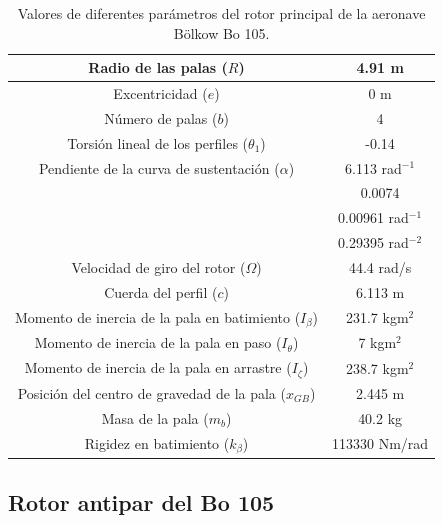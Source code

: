 \begin{table}[]
	\centering
	\begin{tabular}{|>{\columncolor{Gray}}c|c|}
		\hline
		Radio de las palas ($R$) & 4.91 m \\ \hline
		Excentricidad ($e$) & 0 m \\ \hline
		Número de palas ($b$) & 4 \\ \hline
		Torsión lineal de los perfiles ($\theta_1$) & -0.14 \\ \hline
		Pendiente de la curva de sustentación ($\alpha$) & 6.113 rad$^{-1}$ \\ \hline
		\cellcolor{Gray} & 0.0074 \\ \cline{2-2} 
		\cellcolor{Gray} & 0.00961 rad$^{-1}$ \\ \cline{2-2} 
		\multirow{-3}{*}{\cellcolor{Gray}Parámetros de la polar ($\delta_0$, $\delta_1$, $\delta_2$)} & 0.29395 rad$^{-2}$ \\ \hline
		Velocidad de giro del rotor ($\Omega$) & 44.4 rad/s \\ \hline
		Cuerda del perfil ($c$) & 6.113 m \\ \hline
		Momento de inercia de la pala en batimiento ($I_\beta$) & 231.7 kgm$^2$ \\ \hline
		Momento de inercia de la pala en paso ($I_\theta$) & 7 kgm$^2$ \\ \hline
		Momento de inercia de la pala en arrastre ($I_\zeta$) & 238.7 kgm$^2$ \\ \hline
		Posición del centro de gravedad de la pala ($x_{GB}$) & 2.445 m \\ \hline
		Masa de la pala ($m_b$) & 40.2 kg \\ \hline
		Rigidez en batimiento ($k_\beta$) & 113330 Nm/rad \\ \hline
	\end{tabular}
	\caption{Valores de diferentes parámetros del rotor principal de la aeronave Bölkow Bo 105.}
	\label{RPBo}
\end{table}

\subsection{Rotor antipar del Bo 105}

